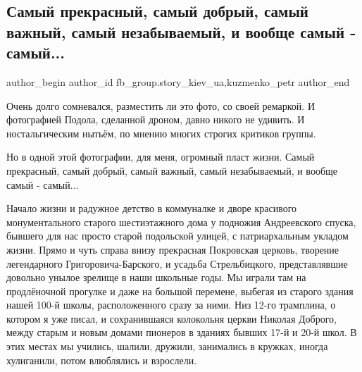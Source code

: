  
 
 
 
 
 
\subsection{Самый прекрасный, самый добрый, самый важный, самый незабываемый, и вообще самый - самый...}
\label{sec:10_12_2021.fb.fb_group.story_kiev_ua.2.samyj_samyj_podol}
 
\ifcmt
 author_begin
   author_id fb_group.story_kiev_ua,kuzmenko_petr
 author_end
\fi

Очень долго сомневался, разместить ли это фото, со своей ремаркой. И
фотографией Подола, сделанной дроном, давно никого не удивить. И
ностальгическим нытьём, по мнению многих строгих критиков группы. 

Но в одной этой фотографии, для меня, огромный пласт жизни. Самый прекрасный,
самый добрый, самый важный, самый незабываемый, и вообще самый - самый... 


Начало жизни и радужное детство в коммуналке и дворе красивого монументального
старого шестиэтажного дома у подножия Андреевского спуска, бывшего для нас
просто старой подольской улицей, с патриархальным укладом жизни. Прямо и чуть
справа внизу прекрасная Покровская церковь, творение легендарного
Григоровича\hyp Барского, и усадьба Стрельбицкого, представлявшие довольно унылое
зрелище в наши школьные годы. Мы играли там на продлёночной прогулке и даже на
большой перемене, выбегая из старого здания нашей 100-й школы, расположенного
сразу за ними. Низ 12-го трамплина, о котором я уже писал, и сохранившаяся
колокольня церкви Николая Доброго, между старым и новым домами пионеров в
зданиях бывших 17-й и 20-й школ. В этих местах мы учились, шалили, дружили,
занимались в кружках, иногда хулиганили, потом влюблялись и взрослели. 

